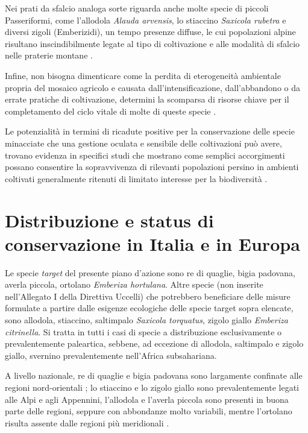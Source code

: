 \documentclass[10pt,twoside,openany,x11names,svgnames,italian,a5paper,dvipsnames,table]{memoir}
\begin{document}
Nei prati da sfalcio analoga sorte riguarda anche molte specie di piccoli Passeriformi, come l’allodola \emph{Alauda arvensis}, lo stiaccino \emph{Saxicola rubetra} e diversi zigoli (Emberizidi), un tempo presenze diffuse, le cui popolazioni alpine risultano inscindibilmente legate al tipo di coltivazione e alle modalità di sfalcio nelle praterie montane \cite{Muller05} \cite{Britschgi06}. 

Infine, non bisogna dimenticare come la perdita di eterogeneità ambientale propria del mosaico agricolo e causata dall’intensificazione, dall’abbandono o da errate pratiche di coltivazione, determini la scomparsa di risorse chiave per il completamento del ciclo vitale di molte di queste specie \cite{Benton03} \cite{Heikkinen04} \cite{Brambilla08} \cite{Brambilla12} \cite{Vickery12}.

Le potenzialità in termini di ricadute positive per la conservazione delle specie minacciate che una gestione oculata e sensibile delle coltivazioni può avere, trovano evidenza in specifici studi che mostrano come semplici accorgimenti possano consentire la sopravvivenza di rilevanti popolazioni persino in ambienti coltivati generalmente ritenuti di limitato interesse per la biodiversità \cite{Arlettaz10} \cite{Casale09}. 




\section{Distribuzione e status di conservazione in Italia e in Europa}
Le specie \emph{target} del presente piano d'azione sono re di quaglie, bigia padovana, averla piccola, ortolano \emph{Emberiza hortulana}. Altre specie (non inserite nell'Allegato I della Direttiva Uccelli) che potrebbero beneficiare delle misure formulate a partire dalle esigenze ecologiche delle specie target sopra elencate, sono allodola, stiaccino, saltimpalo \emph{Saxicola torquatus}, zigolo giallo \emph{Emberiza citrinella}. Si tratta in tutti i casi di specie a distribuzione esclusivamente o prevalentemente paleartica, sebbene, ad eccezione di allodola, saltimpalo e zigolo giallo, svernino prevalentemente nell'Africa subsahariana.

A livello nazionale, re di quaglie e bigia padovana sono largamente confinate alle regioni nord-orientali \cite{Gustin09}; lo stiaccino e lo zigolo giallo sono prevalentemente legati alle Alpi e agli  Appennini, l'allodola e l'averla piccola sono presenti in buona parte delle regioni, seppure con abbondanze molto variabili, mentre l'ortolano risulta assente dalle regioni più meridionali \cite{Gustin09} \cite{Gustin10}.
\end{document}
